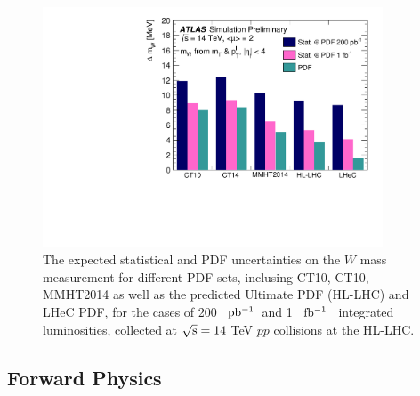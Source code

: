 \documentclass{article}
\newcommand*{\fbinv}{\ensuremath{{\rm fb^{-1}}}\xspace}
\newcommand*{\pbinv}{\ensuremath{{\rm pb^{-1}}}\xspace}
\begin{document}
\begin{figure}
\centering
\includegraphics[width=0.9\textwidth]{Wmass_fig_06.pdf}
\caption{\label{Fig:Wmass} The expected statistical and PDF uncertainties on the $W$ mass measurement for different PDF sets, inclusing CT10, CT10, MMHT2014 as well as the predicted Ultimate PDF (HL-LHC) and LHeC PDF,  for the cases of 200 ~\pbinv ~and 1 ~\fbinv~  integrated luminosities, collected at ${\rm \sqrt{s}=14}$ TeV $pp$ collisions at the HL-LHC.}
\end{figure}


\subsection{Forward Physics}
\end{document}
